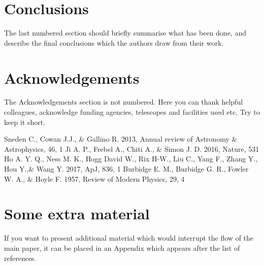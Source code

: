 \documentclass[a4paper,fleqn,usenatbib]{mnras}
\begin{document}
\section{Conclusions}

The last numbered section should briefly summarise what has been done, and describe
the final conclusions which the authors draw from their work.

\section*{Acknowledgements}

The Acknowledgements section is not numbered. Here you can thank helpful
colleagues, acknowledge funding agencies, telescopes and facilities used etc.
Try to keep it short.




\begin{thebibliography}{99}
	Sneden C., Cowan J.J., \& Gallino R. 2013, Annual review of Astronomy \& Astrophysics, 46, 1
	Ji A. P., Frebel A., Chiti A., \& Simon J. D. 2016, Nature, 531
	Ho A. Y. Q., Ness M. K., Hogg David W., Rix H-W., Liu C., Yang F., Zhang Y., Hou Y.,\& Wang Y. 2017, ApJ, 836, 1
	Burbidge E. M., Burbidge G. R., Fowler W. A., \& Hoyle F. 1957, Review of Modern Physics, 29, 4
\end{thebibliography}



\appendix
\newpage

\section{Some extra material}

If you want to present additional material which would interrupt the flow of the main paper,
it can be placed in an Appendix which appears after the list of references.
\end{document}
